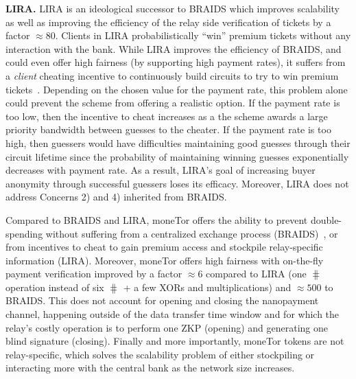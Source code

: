 \medskip\noindent\textbf{LIRA.}
LIRA is an ideological successor to BRAIDS which improves scalability as well as improving the efficiency of the relay side verification of tickets by a factor $\approx 80$.
Clients in LIRA probabilistically ``win'' premium tickets without any interaction with the bank.
While LIRA improves the efficiency of BRAIDS, and could even offer high fairness (by supporting high payment rates), it suffers from a \textit{client} cheating incentive to continuously build circuits to try to win premium tickets~\cite{jansen2013lira, jansenblogpost}.
Depending on the chosen value for the payment rate, this problem alone could prevent the scheme from offering a realistic option.
If the payment rate is too low, then the incentive to cheat increases as a the scheme awards a large priority bandwidth between guesses to the cheater.
If the payment rate is too high, then guessers would have difficulties maintaining good guesses through their circuit lifetime since the probability of maintaining winning guesses exponentially decreases with payment rate.
As a result, LIRA's goal of increasing buyer anonymity through successful guessers loses its efficacy.
Moreover, LIRA does not address Concerns 2) and 4) inherited from BRAIDS.

Compared to BRAIDS and LIRA, moneTor offers the ability to prevent double-spending without suffering from a centralized exchange process (BRAIDS)~\cite{jansenblogpost}, or from incentives to cheat to gain premium access and stockpile relay-specific information (LIRA).
Moreover, moneTor offers high fairness with on-the-fly payment verification improved by a factor $\approx 6$ compared to LIRA (one $\hash$ operation instead of six $\hash$ + a few XORs and multiplications) and $\approx 500$ to BRAIDS.
This does not account for opening and closing the nanopayment channel, happening outside of the data transfer time window and for which the relay's costly operation is to perform one ZKP (opening) and generating one blind signature (closing).
Finally and more importantly, moneTor tokens are not relay-specific, which solves the scalability problem of either stockpiling or interacting more with the central bank as the network size increases.

